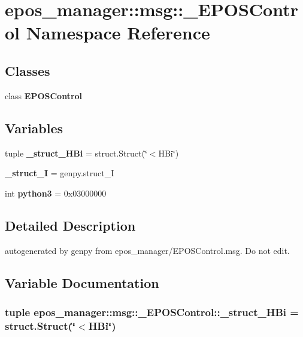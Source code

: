 \section{epos\-\_\-manager\-:\-:msg\-:\-:\-\_\-\-E\-P\-O\-S\-Control \-Namespace \-Reference}
\label{namespaceepos__manager_1_1msg_1_1__EPOSControl}
\subsection*{\-Classes}
\begin{DoxyCompactItemize}
\item 
class {\bf \-E\-P\-O\-S\-Control}
\end{DoxyCompactItemize}
\subsection*{\-Variables}
\begin{DoxyCompactItemize}
\item 
tuple {\bf \-\_\-struct\-\_\-\-H\-Bi} = struct.\-Struct(\char`\"{}$<$\-H\-Bi\char`\"{})
\item 
{\bf \-\_\-struct\-\_\-\-I} = genpy.\-struct\-\_\-\-I
\item 
int {\bf python3} = 0x03000000
\end{DoxyCompactItemize}


\subsection{\-Detailed \-Description}
\begin{DoxyVerb}autogenerated by genpy from epos_manager/EPOSControl.msg. Do not edit.\end{DoxyVerb}
 

\subsection{\-Variable \-Documentation}
\subsubsection[{\-\_\-struct\-\_\-\-H\-Bi}]{\setlength{\rightskip}{0pt plus 5cm}tuple {\bf epos\-\_\-manager\-::msg\-::\-\_\-\-E\-P\-O\-S\-Control\-::\-\_\-struct\-\_\-\-H\-Bi} = struct.\-Struct(\char`\"{}$<$\-H\-Bi\char`\"{})}\label{namespaceepos__manager_1_1msg_1_1__EPOSControl_a4f273b52bf9135d0148ef29ef68a1d76}


